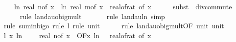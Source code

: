 \begin{isabellebody}
\ \ \ \ {\isacharparenleft}{\kern0pt}ln\ {\isacharparenleft}{\kern0pt}real\ {\isacharparenleft}{\kern0pt}n{\isacharunderscore}{\kern0pt}of\ x{\isacharparenright}{\kern0pt}{\isacharparenright}{\kern0pt}\ {\isacharplus}{\kern0pt}\ ln\ {\isacharparenleft}{\kern0pt}real\ {\isacharparenleft}{\kern0pt}m{\isacharunderscore}{\kern0pt}of\ x{\isacharparenright}{\kern0pt}{\isacharparenright}{\kern0pt}{\isacharparenright}{\kern0pt}\ {\isacharslash}{\kern0pt}\ {\isacharparenleft}{\kern0pt}real{\isacharunderscore}{\kern0pt}of{\isacharunderscore}{\kern0pt}rat\ {\isacharparenleft}{\kern0pt}{\isasymdelta}{\isacharunderscore}{\kern0pt}of\ x{\isacharparenright}{\kern0pt}{\isacharparenright}{\kern0pt}\isanewline
\ \ \ \ \isamarkupfalse%
\ {\isacharparenleft}{\kern0pt}subst\ {\isacharparenleft}{\kern0pt}{}{\isacharparenright}{\kern0pt}\ div{\isacharunderscore}{\kern0pt}commute{\isacharparenright}{\kern0pt}\isanewline
\ \ \ \ \isamarkupfalse%
\ {\isacharparenleft}{\kern0pt}rule\ landau{\isacharunderscore}{\kern0pt}o{\isachardot}{\kern0pt}big{\isacharunderscore}{\kern0pt}mult{\isacharunderscore}{\kern0pt}{}{\isacharparenright}{\kern0pt}\isanewline
\ \ \ \ \ \isamarkupfalse%
\ {\isacharparenleft}{\kern0pt}rule\ landau{\isacharunderscore}{\kern0pt}ln{\isacharunderscore}{\kern0pt}{}{\isacharcomma}{\kern0pt}\ simp{\isacharparenright}{\kern0pt}\isanewline
\ \ \ \ \ \isamarkupfalse%
\ {\isacharparenleft}{\kern0pt}rule\ sum{\isacharunderscore}{\kern0pt}in{\isacharunderscore}{\kern0pt}bigo{\isacharcomma}{\kern0pt}\ rule\ l{}{\isacharcomma}{\kern0pt}\ rule\ unit{\isacharunderscore}{\kern0pt}{}{\isacharparenright}{\kern0pt}\isanewline
\ \ \ \ \isamarkupfalse%
\ {\isacharparenleft}{\kern0pt}rule\ landau{\isacharunderscore}{\kern0pt}o{\isachardot}{\kern0pt}big{\isacharunderscore}{\kern0pt}mult{\isacharunderscore}{\kern0pt}{}{\isacharbrackleft}{\kern0pt}OF\ unit{\isacharunderscore}{\kern0pt}{}\ unit{\isacharunderscore}{\kern0pt}{}{\isacharbrackright}{\kern0pt}{\isacharparenright}{\kern0pt}\isanewline
\isanewline
\ \ \isamarkupfalse%
\ l{}{\isacharcolon}{\kern0pt}\ {\isachardoublequoteopen}{\isacharparenleft}{\kern0pt}{\isasymlambda}x{\isachardot}{\kern0pt}\ ln\ {\isacharparenleft}{\kern0pt}{}\ {\isacharplus}{\kern0pt}\ {}\ {\isacharasterisk}{\kern0pt}\ real\ {\isacharparenleft}{\kern0pt}n{\isacharunderscore}{\kern0pt}of\ x{\isacharparenright}{\kern0pt}{\isacharparenright}{\kern0pt}{\isacharparenright}{\kern0pt}\ {\isasymin}\ O{\isacharbrackleft}{\kern0pt}{\isacharquery}{\kern0pt}F{\isacharbrackright}{\kern0pt}{\isacharparenleft}{\kern0pt}{\isasymlambda}x{\isachardot}{\kern0pt}\ ln\ {\isacharparenleft}{\kern0pt}{}\ {\isacharslash}{\kern0pt}\ real{\isacharunderscore}{\kern0pt}of{\isacharunderscore}{\kern0pt}rat\ {\isacharparenleft}{\kern0pt}{\isasymepsilon}{\isacharunderscore}{\kern0pt}of\ x{\isacharparenright}{\kern0pt}{\isacharparenright}{\kern0pt}\ {\isacharasterisk}{\kern0pt}\ \isanewline

\end{isabellebody}
